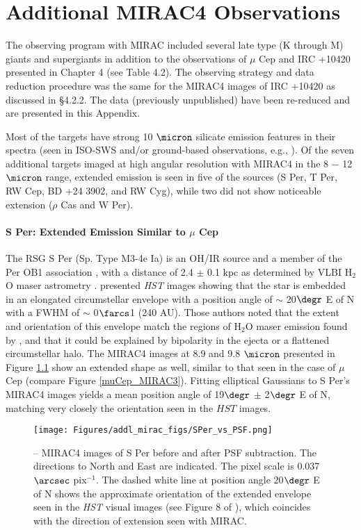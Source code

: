 
\chapter{Additional MIRAC4 Observations} 
\label{app:sofia_mirac}

The observing program with MIRAC included several late type (K through M) giants and supergiants in addition to the observations of $\mu$ Cep and IRC +10420 presented in Chapter 4 (see Table 4.2).  The observing strategy and data reduction procedure was the same for the MIRAC4 images of IRC +10420 as discussed in \S 4.2.2.  The data (previously unpublished) have been re-reduced and are presented in this Appendix.  

Most of the targets have strong 10 $\micron$ silicate emission features in their spectra (seen in ISO-SWS and/or ground-based observations, e.g., \citet{Sylvester:1998}).  Of the seven additional targets imaged at high angular resolution with MIRAC4 in the 8 $-$ 12 $\micron$ range, extended emission is seen in five of the sources (S Per, T Per, RW Cep, BD +24 3902, and RW Cyg), while two did not show noticeable extension ($\rho$ Cas and W Per).  

\subsubsection{S Per: Extended Emission Similar to $\mu$ Cep}
The RSG S Per (Sp. Type M3-4e Ia) is an OH/IR source and a member of the Per OB1 association \citep{Humphreys:1978}, with a distance of 2.4 $\pm$ 0.1 kpc as determined by VLBI H$_{2}$O maser astrometry \citep{Asaki:2010}.  \citet{Schuster:2006} presented \emph{HST} images showing that the star is embedded in an elongated circumstellar envelope with a position angle of $\sim$ 20$\degr$ E of N with a FWHM of $\sim$ 0$\farcs$1 (240 AU).  Those authors noted that the extent and orientation of this envelope match the regions of H$_{2}$O maser emission found by \citet{Richards:1999}, and that it could be explained by bipolarity in the ejecta or a flattened circumstellar halo.  The MIRAC4 images at 8.9 and 9.8 $\micron$ presented in Figure \ref{fig:SPer_MIRAC4} show an extended shape as well, similar to that seen in the case of $\mu$ Cep (compare Figure \ref{muCep_MIRAC3}).  Fitting elliptical Gaussians to S Per's MIRAC4 images yields a mean position angle of 19$\degr$ $\pm$ 2$\degr$ E of N, matching very closely the orientation seen in the $HST$ images.  

\begin{figure}[htp]
\centering
\texttt{[image: Figures/addl\_mirac\_figs/SPer\_vs\_PSF.png]}	
\caption[MIRAC4 images of S Per.]{-- MIRAC4 images of S Per before and after PSF subtraction.  The directions to North and East are indicated.  The pixel scale is 0.037$\arcsec$ pix$^{-1}$.  The dashed white line at position angle 20$\degr$ E of N shows the approximate orientation of the extended envelope seen in the \emph{HST} visual images (see Figure 8 of \citet{Schuster:2006}), which coincides with the direction of extension seen with MIRAC.} 
\label{fig:SPer_MIRAC4}
\end{figure} 


